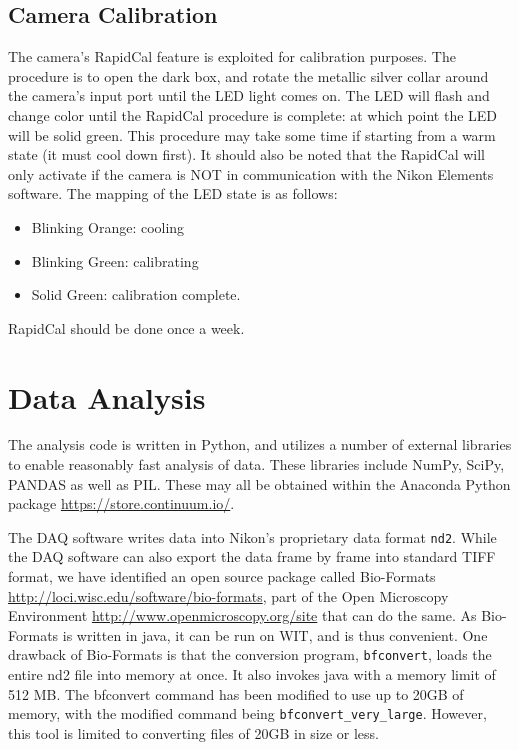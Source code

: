 \documentclass[11pt]{article}
\begin{document}
\subsection{Camera Calibration}
The camera's RapidCal feature is exploited for calibration purposes. The procedure is to open the dark box, and rotate the metallic silver collar around the camera's input port until the LED light comes on.
The LED will flash and change color until the RapidCal procedure is complete: at which point the LED will be solid green. This procedure may take some time if starting from a warm state (it must cool down first).
It should also be noted that the RapidCal will only activate if the camera is NOT in communication with the Nikon Elements software. 
The mapping of the LED state is as follows:
\begin{itemize}
\item Blinking Orange: cooling
\item Blinking Green: calibrating
\item Solid Green: calibration complete. 
\end{itemize}
RapidCal should be done once a week.


\section{Data Analysis} %
The analysis code is written in Python, and utilizes a number of external libraries to enable reasonably fast analysis of data. These libraries include NumPy, SciPy, PANDAS as well as PIL. 
These may all be obtained within the Anaconda Python package \url{https://store.continuum.io/}. 

The DAQ software writes data into Nikon's proprietary data format \verb+nd2+. While the DAQ software can also export the data frame by frame into standard TIFF format, we have identified an open source package called Bio-Formats \url{http://loci.wisc.edu/software/bio-formats}, part of the Open Microscopy Environment \url{http://www.openmicroscopy.org/site} that can do the same. As Bio-Formats is written in java, it can be run on WIT, and is thus convenient.  
One drawback of Bio-Formats is that the conversion program, \verb+bfconvert+, loads the entire nd2 file into memory at once. It also invokes java with a memory limit of 512 MB. The bfconvert command has been modified to use up to 20GB of memory, with the modified command being \verb+bfconvert_very_large+. However, this tool is limited to converting files of 20GB in size or less.  
\end{document}
